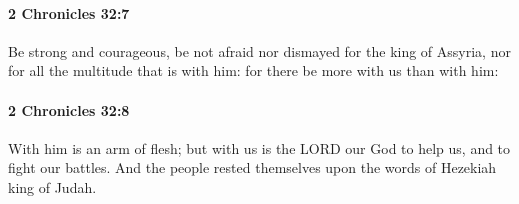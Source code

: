 		\paragraph{2 Chronicles 32:7} %
			\label{2CHRONICLES-32-7}

			Be strong and courageous, be not afraid nor dismayed for the king of Assyria, nor for all the multitude that is with him: for there be more with us than with him:


		\paragraph{2 Chronicles 32:8} %
			\label{2CHRONICLES-32-8}

			With him is an arm of flesh; but with us is the LORD our God to help us, and to fight our battles. And the people rested themselves upon the words of Hezekiah king of Judah.


